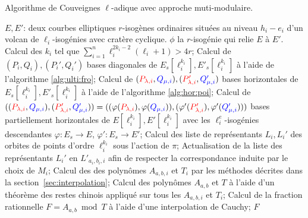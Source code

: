 \documentclass[10pt,a4paper]{book}
\theoremstyle{plain}
\theoremstyle{definition}
\theoremstyle{definition}
\theoremstyle{definition}
\theoremstyle{definition}
\theoremstyle{remark}
\theoremstyle{remark}
\theoremstyle{definition}
\begin{document}
\begin{algorithm}
\caption{\label{alg:cou:mult-adique} Algorithme de Couveignes $\ell$-adique avec approche muti-modulaire.}
\begin{algorithmic}[1]
\REQUIRE $E,E'$: deux courbes elliptiques $r$-isogènes ordinaires situées au niveau $h_i-e_i$ d'un volcan de $\ell_i$-isogénies avec cratère cyclique.
\ENSURE $\phi$ la $r$-isogénie qui relie $E$ à $E'$.
\STATE Calcul des $k_i$ tel que $\sum_{i=1}^n\ell_{i}^{2k_{i}-2}(\ell_{i}+1)>4r$;
\STATE  \label{alg:cou-mult:bdiag:long}
Calcul de $(P_i,Q_i),(P_i',Q_i')$ bases diagonales de $E_s[\ell_i^{k_i}],E'_s[\ell_i^{k_i}]$ à l'aide de l'algorithme \ref{alg:ulti:fro};
\STATE \label{alg:cou-mult:bhor:long}
Calcul de $(\color{red}P_{\lambda,i}\color{black},\color{blue}Q_{\mu,i}\color{black}),(\color{red}P'_{\lambda,i}\color{black},\color{blue}Q'_{\mu,i}\color{black})$ bases horizontales de $E_s[\ell_i^{k_i}],E'_s[\ell_i^{k_i}]$ à l'aide de l'algorithme \ref{alg:hor:poi};
\STATE Calcul de 
~$((\color{red}P_{\lambda,i}\color{black},\color{blue}Q_{\mu,i}\color{black}),(\color{red}P'_{\lambda,i}\color{black},\color{blue}Q_{\mu,i}'\color{black}))=((\varphi(\color{red}P_{\lambda,i}\color{black}),\varphi(\color{blue}Q_{\mu,i}\color{black})),(\varphi'(\color{red}P'_{\lambda,i}\color{black}),\varphi'(\color{blue}Q_{\mu,i}'\color{black})))$ bases partiellement horizontales de $E[\ell_i^{k_i}],E'[\ell_i^{k_i}]$ avec les $\ell_i^e$-isogénies descendantes $\varphi: E_s \rightarrow E$, $\varphi': E_s \rightarrow E'$;
\ENDIF
\STATE \label{alg:mult-ell:rep:long} Calcul des liste de représentants $L_i,L_i'$ des orbites de points d'ordre $\ell_i^{k_i}$ sous l'action de $\pi$;
\ENDFOR
{}
\STATE \label{alg:mult-ell:ord:long} Actualisation de la liste des représentants $L_i'$ en $L'_{a_i,b_i,i}$ afin de respecter la correspondance induite par le choix de $M_i$;
\STATE \label{alg:mult-ell:int:long} Calcul des des polynômes $A_{a,b,i}$ et $T_i$ par les méthodes décrites dans la section~\ref{sec:interpolation};
\ENDFOR
\STATE Calcul des polynômes $A_{a,b}$ et $T$ à l'aide d'un théorème des restes chinois appliqué sur tous les $A_{a,b,i}$ et $T_i$;
\STATE \label{alg:mult-ell:Cauchy:long} Calcul de la fraction rationnelle $F=A_{a,b} \bmod T$ à l'aide d'une interpolation de Cauchy;
\RETURN $F$
\ENDIF
\ENDFOR 
\end{algorithmic}
\end{algorithm}
\end{document}
